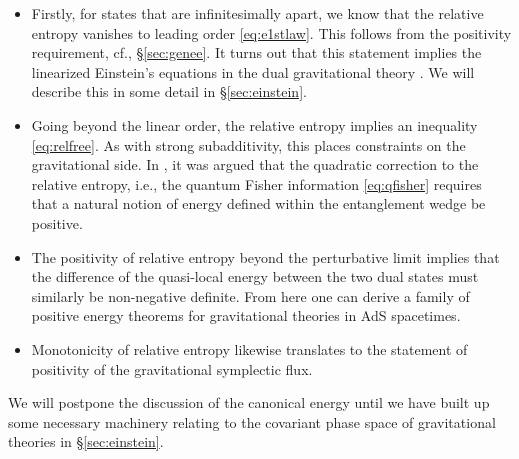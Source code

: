 \documentclass[12pt,openany]{book}
\begin{document}
\begin{itemize}
\item Firstly, for states that are infinitesimally apart, we know that the relative entropy vanishes to leading order \eqref{eq:e1stlaw}. This follows from the positivity requirement, cf., \S\ref{sec:genee}. It turns out that this statement implies the linearized Einstein's equations in the dual gravitational theory \cite{Lashkari:2013koa,Faulkner:2013ica}. We will describe this in some detail in \S\ref{sec:einstein}.
\item Going beyond the linear order, the relative entropy implies an inequality \eqref{eq:relfree}. As with strong subadditivity, this places constraints on the gravitational side. In \cite{Lashkari:2015hha}, it was argued that the quadratic correction to the relative entropy, i.e., the quantum Fisher information \eqref{eq:qfisher} requires that a natural notion of energy defined within the entanglement wedge be positive.
\item The positivity of relative entropy beyond the perturbative limit implies that the difference of the quasi-local energy between the two dual states must similarly be non-negative definite. From here one can derive a family of positive energy theorems for gravitational theories in AdS spacetimes.
\item Monotonicity of relative entropy likewise translates to the statement of positivity of the gravitational symplectic flux.
\end{itemize}

We will postpone the discussion of the canonical energy until we have built up some necessary machinery relating to the covariant phase space of gravitational theories in \S\ref{sec:einstein}.
\end{document}
